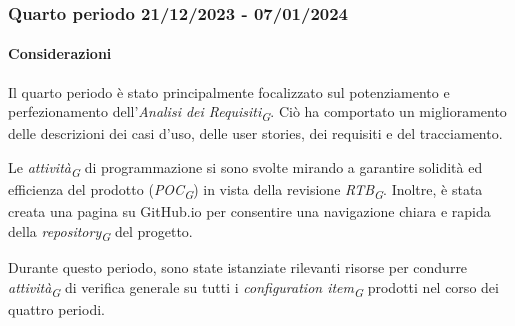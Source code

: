 

\subsubsection{Quarto periodo  21/12/2023 - 07/01/2024}
\paragraph{Considerazioni}
Il quarto periodo è stato principalmente focalizzato sul potenziamento e perfezionamento dell'\textit{Analisi dei Requisiti}\textsubscript{\textit{G}}. Ciò ha comportato un miglioramento delle descrizioni dei casi d'uso, delle user stories, dei requisiti e del tracciamento.

Le \textit{attività}\textsubscript{\textit{G}} di programmazione si sono svolte mirando a garantire solidità ed efficienza del prodotto (\textit{POC}\textsubscript{\textit{G}}) in vista della revisione \textit{RTB}\textsubscript{\textit{G}}. 
Inoltre, è stata creata una pagina su GitHub.io per consentire una navigazione chiara e rapida della \textit{repository}\textsubscript{\textit{G}} del progetto.

Durante questo periodo, sono state istanziate rilevanti risorse per condurre \textit{attività}\textsubscript{\textit{G}} di verifica generale su tutti i \textit{configuration item}\textsubscript{\textit{G}} prodotti nel corso dei quattro periodi.

